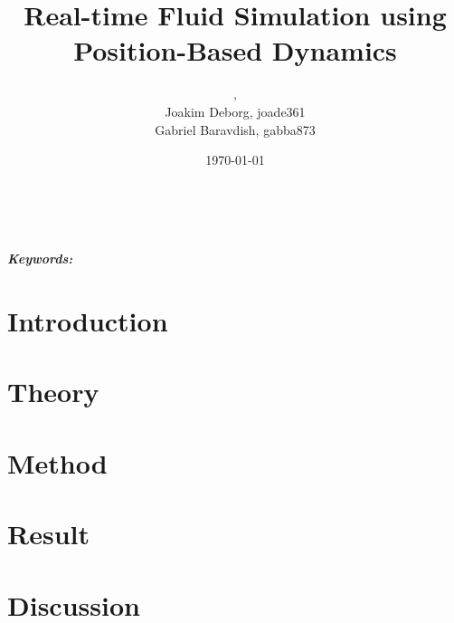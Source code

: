 \documentclass[a4paper, 11pt]{article} %
\title{\textbf{Real-time Fluid Simulation using Position-Based Dynamics}}
\author{\vspace{-1.2cm}{Niklas Andersson, nikan278},
\\{Joakim Deborg, joade361}
\\{Gabriel Baravdish, gabba873}}
\date{\today} %
\makeatletter
\providecommand{\keywords}[1]{\textbf{\textit{Keywords:}} #1}
\renewcommand{\maketitle}{ %
\begin{center} 
{\LARGE\@title} %

\vspace{50pt} %

{\large\@author} %
\\\@date %

\vspace{40pt} %
\end{center}
}
\makeatother
\begin{document}
\maketitle %



\vspace{-1.2cm}

\begin{abstract}

\end{abstract}

\noindent \keywords{}

\vspace{30pt} %


\newpage

\tableofcontents

\newpage

\section{Introduction}


\section{Theory}


\section{Method}


\section{Result}


\section{Discussion}



\newpage






\end{document}
